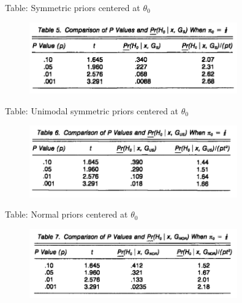 \begin{frame}{Table: Symmetric priors centered at $\theta_0$}

\begin{figure}[t]
\includegraphics[width=0.8\textwidth]{figures/table5}
\centering
\end{figure}

\end{frame}



\begin{frame}{Table: Unimodal symmetric priors centered at $\theta_0$}

\begin{figure}[t]
\includegraphics[width=0.8\textwidth]{figures/table6}
\centering
\end{figure}

\end{frame}



\begin{frame}{Table: Normal priors centered at $\theta_0$}

\begin{figure}[t]
\includegraphics[width=0.8\textwidth]{figures/table7}
\centering
\end{figure}

\end{frame}




